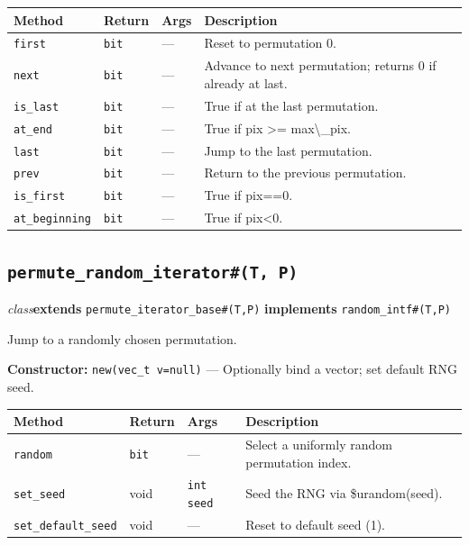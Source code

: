 \documentclass[11pt,letterpaper]{report}
\begin{document}
\begin{xltabular}{\linewidth}{>{\small}p{1.35in} >{\small}p{1.25in} >{\small}p{0.95in} >{\small}X}
\toprule
\textbf{Method} & \textbf{Return} & \textbf{Args} & \textbf{Description} \\
\midrule
\endhead
\bottomrule
\endfoot
\texttt{first} & \texttt{bit} & --- & Reset to permutation 0. \\
\texttt{next} & \texttt{bit} & --- & Advance to next permutation; returns 0 if already at last. \\
\texttt{is\_last} & \texttt{bit} & --- & True if at the last permutation. \\
\texttt{at\_end} & \texttt{bit} & --- & True if pix \textgreater{}= max\textbackslash{}\_pix. \\
\texttt{last} & \texttt{bit} & --- & Jump to the last permutation. \\
\texttt{prev} & \texttt{bit} & --- & Return to the previous permutation. \\
\texttt{is\_first} & \texttt{bit} & --- & True if pix==0. \\
\texttt{at\_beginning} & \texttt{bit} & --- & True if pix\textless{}0. \\
\end{xltabular}

\subsection*{\texttt{permute\_random\_iterator\#(T, P)}}
\noindent\small\textit{class}\quad \textbf{extends} \texttt{permute\_iterator\_base\#(T,P)} \quad \textbf{implements} \texttt{random\_intf\#(T,P)}\par

Jump to a randomly chosen permutation.

\noindent\textbf{Constructor:} \texttt{new(vec\_t v=null)} --- Optionally bind a vector; set default RNG seed.

\begin{xltabular}{\linewidth}{>{\small}p{1.35in} >{\small}p{1.25in} >{\small}p{0.95in} >{\small}X}
\toprule
\textbf{Method} & \textbf{Return} & \textbf{Args} & \textbf{Description} \\
\midrule
\endhead
\bottomrule
\endfoot
\texttt{random} & \texttt{bit} & --- & Select a uniformly random permutation index. \\
\texttt{set\_seed} & void & \texttt{int seed} & Seed the RNG via \$urandom(seed). \\
\texttt{set\_default\_seed} & void & --- & Reset to default seed (1). \\
\end{xltabular}
\end{document}
